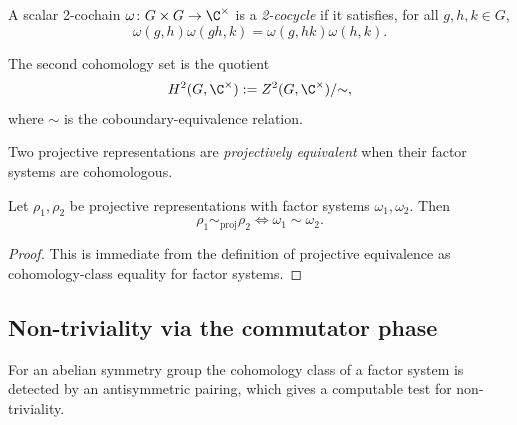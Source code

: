 \begin{definition}\label{def:is_cocycle}
    \leanok
    A scalar 2-cochain $\omega \colon G \times G \to \C^{\times}$ is a
    \emph{2-cocycle} if it satisfies, for all $g,h,k \in G$,
    \[
        \omega(g,h) \omega(gh,k) = \omega(g,hk) \omega(h,k).
    \]
\end{definition}

\begin{definition}\label{def:h2_cx}
    \leanok
    The second cohomology set is the quotient
    \[
        H^2(G,\C^{\times})
        := Z^2(G,\C^{\times})/{\sim},
    \]
    where $\sim$ is the coboundary-equivalence relation.
\end{definition}

\begin{definition}\label{def:projectively_equivalent}
    \leanok
    Two projective representations are \emph{projectively equivalent}
    when their factor systems are cohomologous.
\end{definition}

\begin{theorem}%
    \label{thm:projrep_equiv_iff_cohomologous}
    \leanok
    Let $\rho_1,\rho_2$ be projective representations with factor systems
    $\omega_1,\omega_2$. Then
    \[
        \rho_1 \sim_{\mathrm{proj}} \rho_2
        \iff
        \omega_1 \sim \omega_2.
    \]
\end{theorem}

\begin{proof}\leanok{}
    This is immediate from the definition of projective equivalence as
    cohomology-class equality for factor systems.
\end{proof}

\subsection{Non-triviality via the commutator phase}

For an abelian symmetry group the cohomology class of a factor system is
detected by an antisymmetric pairing, which gives a computable test for
non-triviality.

